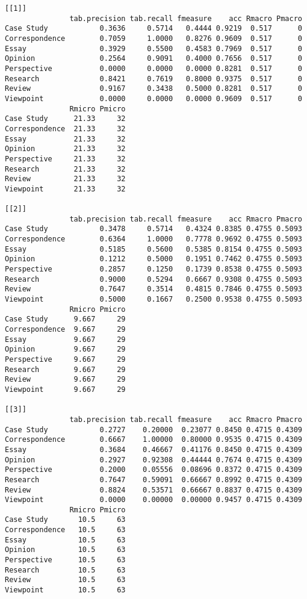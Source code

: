 \documentclass[]{article}
\begin{document}
\begin{lstlisting}[frame=single]
[[1]]
               tab.precision tab.recall fmeasure    acc Rmacro Pmacro
Case Study            0.3636     0.5714   0.4444 0.9219  0.517      0
Correspondence        0.7059     1.0000   0.8276 0.9609  0.517      0
Essay                 0.3929     0.5500   0.4583 0.7969  0.517      0
Opinion               0.2564     0.9091   0.4000 0.7656  0.517      0
Perspective           0.0000     0.0000   0.0000 0.8281  0.517      0
Research              0.8421     0.7619   0.8000 0.9375  0.517      0
Review                0.9167     0.3438   0.5000 0.8281  0.517      0
Viewpoint             0.0000     0.0000   0.0000 0.9609  0.517      0
               Rmicro Pmicro
Case Study      21.33     32
Correspondence  21.33     32
Essay           21.33     32
Opinion         21.33     32
Perspective     21.33     32
Research        21.33     32
Review          21.33     32
Viewpoint       21.33     32

[[2]]
               tab.precision tab.recall fmeasure    acc Rmacro Pmacro
Case Study            0.3478     0.5714   0.4324 0.8385 0.4755 0.5093
Correspondence        0.6364     1.0000   0.7778 0.9692 0.4755 0.5093
Essay                 0.5185     0.5600   0.5385 0.8154 0.4755 0.5093
Opinion               0.1212     0.5000   0.1951 0.7462 0.4755 0.5093
Perspective           0.2857     0.1250   0.1739 0.8538 0.4755 0.5093
Research              0.9000     0.5294   0.6667 0.9308 0.4755 0.5093
Review                0.7647     0.3514   0.4815 0.7846 0.4755 0.5093
Viewpoint             0.5000     0.1667   0.2500 0.9538 0.4755 0.5093
               Rmicro Pmicro
Case Study      9.667     29
Correspondence  9.667     29
Essay           9.667     29
Opinion         9.667     29
Perspective     9.667     29
Research        9.667     29
Review          9.667     29
Viewpoint       9.667     29

[[3]]
               tab.precision tab.recall fmeasure    acc Rmacro Pmacro
Case Study            0.2727    0.20000  0.23077 0.8450 0.4715 0.4309
Correspondence        0.6667    1.00000  0.80000 0.9535 0.4715 0.4309
Essay                 0.3684    0.46667  0.41176 0.8450 0.4715 0.4309
Opinion               0.2927    0.92308  0.44444 0.7674 0.4715 0.4309
Perspective           0.2000    0.05556  0.08696 0.8372 0.4715 0.4309
Research              0.7647    0.59091  0.66667 0.8992 0.4715 0.4309
Review                0.8824    0.53571  0.66667 0.8837 0.4715 0.4309
Viewpoint             0.0000    0.00000  0.00000 0.9457 0.4715 0.4309
               Rmicro Pmicro
Case Study       10.5     63
Correspondence   10.5     63
Essay            10.5     63
Opinion          10.5     63
Perspective      10.5     63
Research         10.5     63
Review           10.5     63
Viewpoint        10.5     63


\end{lstlisting}
\end{document}
